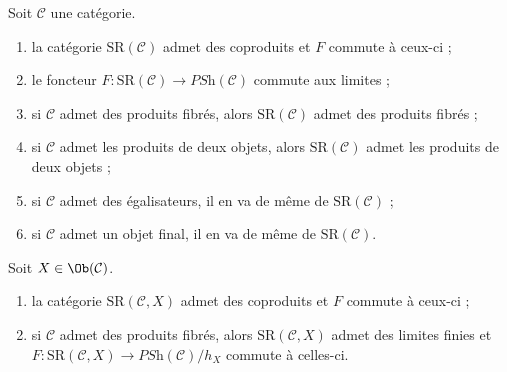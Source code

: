 \begin{lemma}
\label{lemma-coprod-prod-SR}
Soit $\mathcal{C}$ une catégorie.
\begin{enumerate}
\item la catégorie $\text{SR}(\mathcal{C})$ admet des coproduits
et $F$ commute à ceux-ci ;
\item le foncteur $F : \text{SR}(\mathcal{C}) \to \textit{PSh}(\mathcal{C})$
commute aux limites ;
\item si $\mathcal{C}$ admet des produits fibrés, alors $\text{SR}(\mathcal{C})$
admet des produits fibrés ;
\item si $\mathcal{C}$ admet les produits de deux objets, alors
$\text{SR}(\mathcal{C})$ admet les produits de deux objets ;
\item si $\mathcal{C}$ admet des égalisateurs, il en va de même de $\text{SR}(\mathcal{C})$ ;
\item si $\mathcal{C}$ admet un objet final, il en va de même de $\text{SR}(\mathcal{C})$.
\end{enumerate}
Soit $X \in \Ob(\mathcal{C})$.
\begin{enumerate}
\item la catégorie $\text{SR}(\mathcal{C}, X)$ admet des coproduits
et $F$ commute à ceux-ci ;
\item si $\mathcal{C}$ admet des produits fibrés, alors $\text{SR}(\mathcal{C}, X)$
admet des limites finies et
$F : \text{SR}(\mathcal{C}, X) \to \textit{PSh}(\mathcal{C})/h_X$
commute à celles-ci.
\end{enumerate}
\end{lemma}

